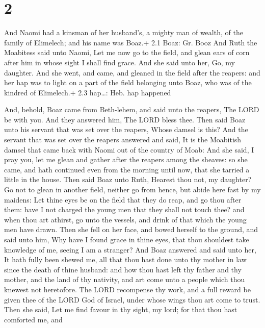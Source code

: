 \hypertarget{section-1}{%
\section{2}\label{section-1}}

 And Naomi had a kinsman of her husband's, a mighty man of
wealth, of the family of Elimelech; and his name was Boaz.+ 2.1 Boaz:
Gr. Booz  And Ruth the Moabitess said unto Naomi, Let me now
go to the field, and glean ears of corn after him in whose sight I shall
find grace. And she said unto her, Go, my daughter.  And she
went, and came, and gleaned in the field after the reapers: and her hap
was to light on a part of the field belonging unto Boaz, who was of the
kindred of Elimelech.+ 2.3 hap\ldots: Heb. hap happened

 And, behold, Boaz came from Beth-lehem, and said unto the
reapers, The LORD be with you. And they answered him, The LORD bless
thee.  Then said Boaz unto his servant that was set over the
reapers, Whose damsel is this?  And the servant that was set
over the reapers answered and said, It is the Moabitish damsel that came
back with Naomi out of the country of Moab:  And she said, I
pray you, let me glean and gather after the reapers among the sheaves:
so she came, and hath continued even from the morning until now, that
she tarried a little in the house.  Then said Boaz unto
Ruth, Hearest thou not, my daughter? Go not to glean in another field,
neither go from hence, but abide here fast by my maidens: 
Let thine eyes be on the field that they do reap, and go thou after
them: have I not charged the young men that they shall not touch thee?
and when thou art athirst, go unto the vessels, and drink of that which
the young men have drawn.  Then she fell on her face, and
bowed herself to the ground, and said unto him, Why have I found grace
in thine eyes, that thou shouldest take knowledge of me, seeing I am a
stranger?  And Boaz answered and said unto her, It hath
fully been shewed me, all that thou hast done unto thy mother in law
since the death of thine husband: and how thou hast left thy father and
thy mother, and the land of thy nativity, and art come unto a people
which thou knewest not heretofore.  The LORD recompense thy
work, and a full reward be given thee of the LORD God of Israel, under
whose wings thou art come to trust.  Then she said, Let me
find favour in thy sight, my lord; for that thou hast comforted me, and
